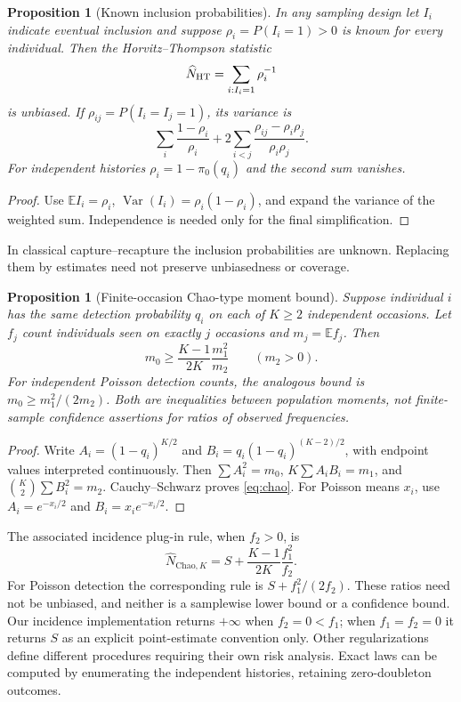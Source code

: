 \documentclass[11pt]{article}
\newtheorem{proposition}[theorem]{Proposition}
\theoremstyle{remark}\newtheorem{remark}[theorem]{Remark}
\newcommand{\E}{\mathbb E}\newcommand{\PP}{\mathbb P}
\newcommand{\Var}{\operatorname{Var}}\newcommand{\Cov}{\operatorname{Cov}}
\begin{document}
\begin{proposition}[Known inclusion probabilities]\label{prop:HT}
In any sampling design let $I_i$ indicate eventual inclusion and suppose
$\rho_i=P(I_i=1)>0$ is known for every individual. Then the
Horvitz--Thompson statistic \cite{HT1952}
\[
 \widehat N_{\rm HT}=\sum_{i:I_i=1}\rho_i^{-1}
\]
is unbiased. If $\rho_{ij}=P(I_i=I_j=1)$, its variance is
\[
 \sum_i\frac{1-\rho_i}{\rho_i}
 +2\sum_{i<j}\frac{\rho_{ij}-\rho_i\rho_j}{\rho_i\rho_j}.
\]
For independent histories $\rho_i=1-\pi_0(q_i)$ and the second sum vanishes.
\end{proposition}
\begin{proof}
Use $\E I_i=\rho_i$, $\Var(I_i)=\rho_i(1-\rho_i)$, and expand the variance
of the weighted sum. Independence is needed only for the final simplification.
\end{proof}
In classical capture--recapture the inclusion probabilities are unknown.
Replacing them by estimates need not preserve unbiasedness or coverage.

\begin{proposition}[Finite-occasion Chao-type moment bound]\label{prop:chao}
Suppose individual $i$ has the same detection probability $q_i$ on each of
$K\ge2$ independent occasions. Let $f_j$ count individuals seen on exactly
$j$ occasions and $m_j=\E f_j$. Then
\begin{equation}\label{eq:chao}
 m_0\ge\frac{K-1}{2K}\frac{m_1^2}{m_2}\qquad(m_2>0).
\end{equation}
For independent Poisson detection counts, the analogous bound is
$m_0\ge m_1^2/(2m_2)$. Both are inequalities between population moments,
not finite-sample confidence assertions for ratios of observed frequencies.
\end{proposition}
\begin{proof}
Write $A_i=(1-q_i)^{K/2}$ and
$B_i=q_i(1-q_i)^{(K-2)/2}$, with endpoint values interpreted continuously.
Then $\sum A_i^2=m_0$, $K\sum A_iB_i=m_1$, and
$\binom K2\sum B_i^2=m_2$. Cauchy--Schwarz proves \eqref{eq:chao}.
For Poisson means $x_i$, use $A_i=e^{-x_i/2}$ and $B_i=x_ie^{-x_i/2}$.
\end{proof}
The associated incidence plug-in rule, when $f_2>0$, is
\[
 \widehat N_{\mathrm{Chao},K}
 =S+\frac{K-1}{2K}\frac{f_1^2}{f_2}.
\]
For Poisson detection the corresponding rule is $S+f_1^2/(2f_2)$.
These ratios need not be unbiased, and neither is a samplewise lower bound
or a confidence bound. Our incidence implementation returns $+\infty$ when
$f_2=0<f_1$; when $f_1=f_2=0$ it returns $S$ as an explicit point-estimate
convention only. Other regularizations define different procedures requiring
their own risk analysis. Exact laws can be computed by enumerating the
independent histories, retaining zero-doubleton outcomes.
\end{document}
